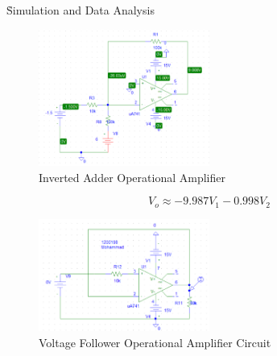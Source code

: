 \documentclass[12pt]{article}
\begin{document}
\tableofcontents
\clearpage
\setlength{\parskip}{\baselineskip}%
\listoffigures
\clearpage
\listoftables
\clearpage
{}
\h{Simulation and Data Analysis}
\begin{figure}[H]
    \centering
    \includegraphics[width=0.5\textwidth]{assets/main/2023-08-20-13-40-43.png}
    \caption{Inverted Adder Operational Amplifier}
\end{figure}
\begin{table}[H]
    \centering
    \caption{Adding Amplifier Voltage Reads}
    \label{tab:my-table}
\end{table}
\begin{equation}
    V_o \approx -9.987V_1 - 0.998V_2
\end{equation}
\begin{figure}[H]
    \centering
    \includegraphics[width=0.5\textwidth]{assets/main/2023-08-20-14-17-05.png}
    \caption{Voltage Follower Operational Amplifier Circuit}
\end{figure}
\end{document}
